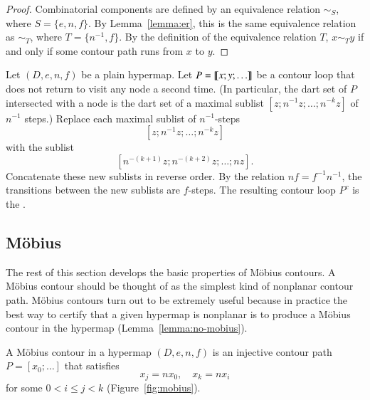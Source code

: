 \begin{proof} 
Combinatorial components are defined by an equivalence relation $\sim_S$, where
$S = \{e,n,f\}$.  By Lemma~\ref{lemma:er}, this is the same equivalence relation as
$\sim_T$, where $T = \{n^{-1},f\}$.  By the definition of the equivalence relation $T$,
$x\sim_T y$ if and only if some contour path runs from $x$ to $y$.
\end{proof}
%

\begin{definition}[complement] 
Let $(D,e,n,f)$ be a plain hypermap.
Let $P={\llbracket{x;y;\ldots}\rrbracket}$ be a contour loop that does not return to visit any node
a second time.   (In particular, the dart set of $P$ intersected with a node
is the dart set of a maximal sublist $[z;n^{-1}z;\ldots;n^{-k}z]$ of $n^{-1}$ steps.)
 Replace each maximal sublist of
$n^{-1}$-steps
\[ 
[z;n^{-1} z; \ldots; n^{-k} z]
\] 
with the sublist
\[ 
[n^{-(k+1)} z;n^{-(k+2)} z;\ldots; n z].
\] 
Concatenate these new sublists in reverse order.  By the relation $n f = f^{-1} n^{-1}$,
the transitions between the new sublists are $f$-steps.
The resulting contour loop $P^c$
is the . 
\end{definition}
%

\figJMTLBJN %



\subsection{M\"obius}

The rest of this section develops the basic properties of M\"obius
contours.  A M\"obius contour should be thought of as the simplest
kind of nonplanar contour path.  M\"obius contours turn out to be
extremely useful because in practice the best way to certify that a
given hypermap is nonplanar is to produce a M\"obius contour in the
hypermap (Lemma~\ref{lemma:no-mobius}).

\begin{definition}
\hspace{-4pt}
 A M\"obius contour in a hypermap
$(D,e,n,f)$ is an
injective contour path $P=[x_0;\ldots]$ that satisfies
\begin{equation}
\label{eqn:mobius}
x_j = n x_0,\quad x_k = n x_i
\end{equation}
for some $0 < i\le j< k$ (Figure~\ref{fig:mobius}).
%
\end{definition}


